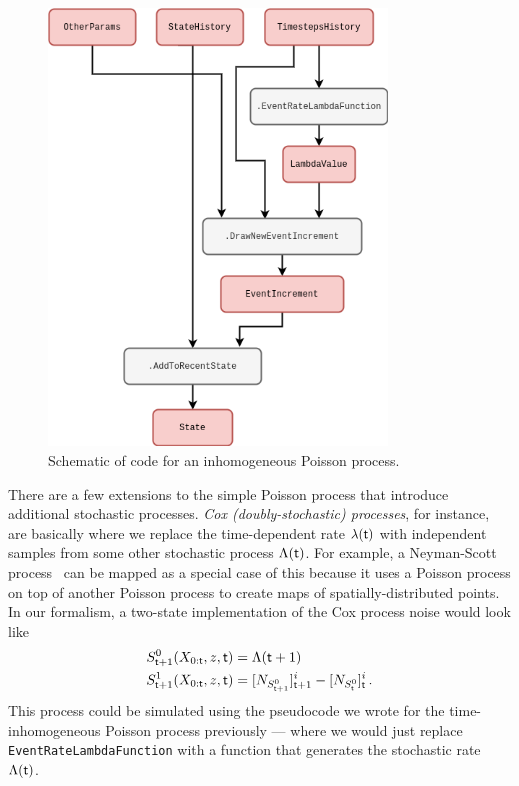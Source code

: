 \begin{figure}[h]
\centering
\includegraphics[width=9cm]{images/chapter-1-inhomogeneous-poisson.drawio.png}
\caption{Schematic of code for an inhomogeneous Poisson process.}
\label{fig:inhomogeneous-poisson}
\end{figure}

There are a few extensions to the simple Poisson process that introduce additional stochastic processes. \emph{Cox (doubly-stochastic) processes}, for instance, are basically where we replace the time-dependent rate $\lambda ({\sf t})$ with independent samples from some other stochastic process $\Lambda ({\sf t})$. For example, a Neyman-Scott process~\cite{neyman1958statistical} can be mapped as a special case of this because it uses a Poisson process on top of another Poisson process to create maps of spatially-distributed points. In our formalism, a two-state implementation of the Cox process noise would look like
\begin{align}
S^{0}_{{\sf t}+1}(X_{0:{\sf t}},z,{\sf t}) &= \Lambda ({\sf t}+1) \\
S^{1}_{{\sf t}+1}(X_{0:{\sf t}},z,{\sf t}) &= [N_{S^{0}_{{\sf t}+1}}]^i_{{\sf t}+1}-[N_{S^{0}_{{\sf t}}}]^i_{\sf t}\,.
\end{align}
This process could be simulated using the pseudocode we wrote for the time-inhomogeneous Poisson process previously --- where we would just replace \texttt{EventRateLambdaFunction} with a function that generates the stochastic rate $\Lambda ({\sf t})$.

